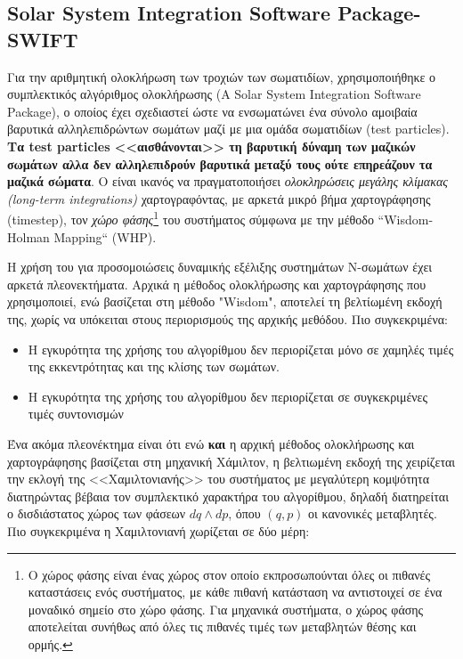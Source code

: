   \subsection{Solar System Integration Software Package- SWIFT}

\gr
Για την αριθμητική ολοκλήρωση των τροχιών των σωματιδίων, χρησιμοποιήθηκε ο συμπλεκτικός αλγόριθμος ολοκλήρωσης {\cite{levison2013swift}(A Solar System Integration Software Package)}, ο οποίος έχει σχεδιαστεί ώστε να ενσωματώνει ένα σύνολο αμοιβαία βαρυτικά αλληλεπιδρώντων σωμάτων μαζί με μια ομάδα σωματιδίων {\en (test particles)}. {\bf Τα {\en test particles} <<αισθάνονται>> τη  βαρυτική δύναμη των μαζικών σωμάτων αλλα δεν αλληλεπιδρούν βαρυτικά μεταξύ τους ούτε επηρεάζουν τα μαζικά σώματα}. Ο {} είναι ικανός να πραγματοποιήσει {\it ολοκληρώσεις μεγάλης κλίμακας {\en (long-term integrations)}} χαρτογραφόντας, με αρκετά μικρό βήμα χαρτογράφησης ({\en timestep}), τον {\it χώρο φάσης}\footnote{Ο χώρος φάσης είναι ένας χώρος στον οποίο εκπροσωπούνται όλες οι πιθανές καταστάσεις ενός συστήματος, με κάθε πιθανή κατάσταση να αντιστοιχεί σε ένα μοναδικό σημείο στο χώρο φάσης. Για μηχανικά συστήματα, ο χώρος φάσης αποτελείται συνήθως από όλες τις πιθανές τιμές των μεταβλητών θέσης και ορμής.} του συστήματος σύμφωνα με την μέθοδο {\en ``Wisdom-Holman Mapping``\cite{wisdom1991symplectic} (WHP)}.

Η χρήση του  \gr για προσομοιώσεις δυναμικής εξέλιξης συστημάτων Ν-σωμάτων έχει αρκετά πλεονεκτήματα. Αρχικά η μέθοδος ολοκλήρωσης και χαρτογράφησης που χρησιμοποιεί, ενώ βασίζεται στη μέθοδο {\en "Wisdom"}\cite{wisdom1982origin}, αποτελεί τη βελτίωμένη εκδοχή της, χωρίς να υπόκειται στους περιορισμούς της αρχικής μεθόδου. Πιο συγκεκριμένα:

 \begin{itemize}
    \item Η εγκυρότητα της χρήσης του αλγορίθμου δεν περιορίζεται μόνο σε χαμηλές τιμές της εκκεντρότητας και της κλίσης των σωμάτων.
    \item Η εγκυρότητα της χρήσης του αλγορίθμου δεν περιορίζεται σε συγκεκριμένες τιμές συντονισμών
 \end{itemize}

Ένα ακόμα πλεονέκτημα είναι ότι ενώ {\bf και} η αρχική μέθοδος ολοκλήρωσης και χαρτογράφησης βασίζεται στη μηχανική Χάμιλτον, η βελτιωμένη εκδοχή της χειρίζεται την εκλογή της <<Χαμιλτονιανής>> του συστήματος με μεγαλύτερη κομψότητα διατηρώντας βέβαια τον συμπλεκτικό χαρακτήρα του αλγορίθμου, δηλαδή διατηρείται ο δισδιάστατος χώρος των φάσεων $dq \wedge dp$, όπου $(q,p)$ οι κανονικές μεταβλητές. Πιο συγκεκριμένα η Χαμιλτονιανή χωρίζεται σε δύο μέρη:


